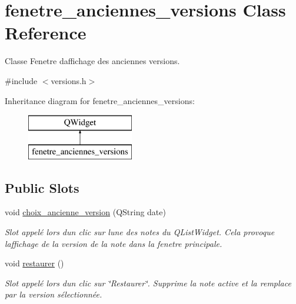 \hypertarget{classfenetre__anciennes__versions}{}\section{fenetre\+\_\+anciennes\+\_\+versions Class Reference}
\label{classfenetre__anciennes__versions}


Classe Fenetre d\textquotesingle{}affichage des anciennes versions.  




{\ttfamily \#include $<$versions.\+h$>$}

Inheritance diagram for fenetre\+\_\+anciennes\+\_\+versions\+:\begin{figure}[H]
\begin{center}
\leavevmode
\includegraphics[height=2.000000cm]{classfenetre__anciennes__versions}
\end{center}
\end{figure}
\subsection*{Public Slots}
\begin{DoxyCompactItemize}
\item 
void \hyperlink{classfenetre__anciennes__versions_aff29c8425f322a7e82c950bc77f5ce6d}{choix\+\_\+ancienne\+\_\+version} (Q\+String date)
\begin{DoxyCompactList}\small\item\em Slot appelé lors d\textquotesingle{}un clic sur l\textquotesingle{}une des notes du Q\+List\+Widget. Cela provoque l\textquotesingle{}affichage de la version de la note dans la fenetre principale. \end{DoxyCompactList}\item 
\mbox{\label{classfenetre__anciennes__versions_a6a4e824ee33424c6fb8f6fd7331ee900}} 
void \hyperlink{classfenetre__anciennes__versions_a6a4e824ee33424c6fb8f6fd7331ee900}{restaurer} ()
\begin{DoxyCompactList}\small\item\em Slot appelé lors d\textquotesingle{}un clic sur \char`\"{}\+Restaurer\char`\"{}. Supprime la note active et la remplace par la version sélectionnée. \end{DoxyCompactList}\end{DoxyCompactItemize}
